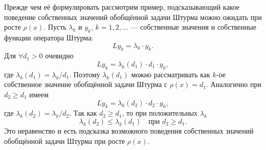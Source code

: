 Прежде чем её формулировать рассмотрим пример, подсказывающий какое поведение собственных значений обобщённой задачи Штурма можно ожидать при росте $\rho(x)$. Пусть $\lambda_k$ и $y_k$, $k=1,2,\ldots$ --- собственные значения и собственные функции оператора Штурма:
\begin{equation*}
	L y_k=\lambda_k\cdot y_k.
\end{equation*}
Для $\forall d_1>0$ очевидно
\begin{equation*}
	L y_k=\lambda_k(d_1)\cdot d_1\cdot y_k,
\end{equation*}
где $\lambda_k(d_1)=\lambda_k/d_1$. Поэтому $\lambda_k(d_1)$ можно рассматривать как $k$-ое собственное значение обобщённой задачи Штурма с $\rho(x)=d_1$. Аналогично при $d_2\geqslant d_1$ имеем 
\begin{equation*}
	L y_k=\lambda_k(d_2)\cdot d_2\cdot y_k,
\end{equation*}
где $\lambda_k(d_2)=\lambda_k/d_2$. Так как $d_2\geqslant d_1$, то при положительных $\lambda_k$
\begin{equation*}
	\lambda_k(d_2)\leqslant\lambda_k(d_1)\quad\text{при }d_2\geqslant d_1.
\end{equation*}
Это неравенство и есть подсказка возможного поведения собственных значений обобщённой задачи Штурма при росте $\rho(x)$.

